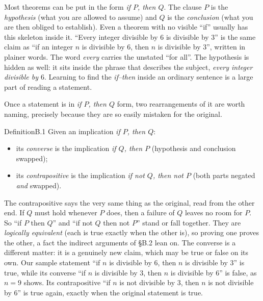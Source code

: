 \documentclass[a4paper,12pt,oneside]{memoir}
\begin{document}
Most theorems can be put in the form \emph{if \(P\), then \(Q\)}. The clause \(P\) is the \emph{hypothesis} (what you are allowed to assume) and \(Q\) is the \emph{conclusion} (what you are then obliged to establish). Even a theorem with no visible “if” usually has this skeleton inside it. “Every integer divisible by \(6\) is divisible by \(3\)” is the same claim as “if an integer \(n\) is divisible by \(6\), then \(n\) is divisible by \(3\)”, written in plainer words. The word \emph{every} carries the unstated “for all”. The hypothesis is hidden as well: it sits inside the phrase that describes the subject, \emph{every integer divisible by \(6\)}. Learning to find the \emph{if–then} inside an ordinary sentence is a large part of reading a statement.

Once a statement is in \emph{if \(P\), then \(Q\)} form, two rearrangements of it are worth naming, precisely because they are so easily mistaken for the original.

\begin{envdefinition}{Definition}{B.1}{}
Given an implication \emph{if \(P\), then \(Q\)}:

\begin{itemize}
  \item its \emph{converse} is the implication \emph{if \(Q\), then \(P\)} (hypothesis and conclusion swapped);
  \item its \emph{contrapositive} is the implication \emph{if not \(Q\), then not \(P\)} (both parts negated \emph{and} swapped).
\end{itemize}
\end{envdefinition}
The contrapositive says the very same thing as the original, read from the other end. If \(Q\) must hold whenever \(P\) does, then a failure of \(Q\) leaves no room for \(P\). So “if \(P\) then \(Q\)” and “if not \(Q\) then not \(P\)” stand or fall together. They are \emph{logically equivalent} (each is true exactly when the other is), so proving one proves the other, a fact the indirect arguments of §B.2 lean on. The converse is a different matter: it is a genuinely new claim, which may be true or false on its own. Our sample statement “if \(n\) is divisible by \(6\), then \(n\) is divisible by \(3\)” is true, while its converse “if \(n\) is divisible by \(3\), then \(n\) is divisible by \(6\)” is false, as \(n = 9\) shows. Its contrapositive “if \(n\) is not divisible by \(3\), then \(n\) is not divisible by \(6\)” is true again, exactly when the original statement is true.
\end{document}
